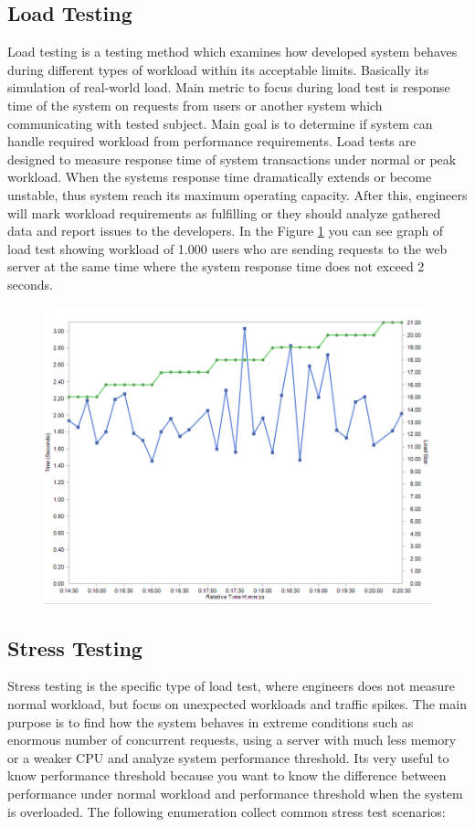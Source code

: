 \subsection*{Load Testing}
Load testing is a testing method which examines how developed system behaves during different types of workload within its acceptable limits. Basically its simulation of real-world load. Main metric to focus during load test is response time of the system on requests from users or another system which communicating with tested subject. Main goal is to determine if system can handle required workload from performance requirements. Load tests are designed to measure response time of system transactions under normal or peak workload. When the systems response time dramatically extends or become unstable, thus system reach its maximum operating capacity. After this, engineers will mark workload requirements as fulfilling or they should analyze gathered data and report issues to the developers. In the Figure \ref{fig:load_test} you can see graph of load test showing workload of 1.000 users who are sending requests to the web server at the same time where the system response time does not exceed 2 seconds.

\begin{figure}[H]
  \centering
  \includegraphics[width=15cm]{obrazky-figures/load-testing.png}
  \caption{}
  \label{fig:load_test}
\end{figure}

\subsection*{Stress Testing}
\label{Stress Testing}
Stress testing is the specific type of load test, where engineers does not measure normal workload, but focus on unexpected workloads and traffic spikes. The main purpose is to find how the system behaves in extreme conditions such as enormous number of concurrent requests, using a server with much less memory or a weaker CPU and analyze system performance threshold. Its very useful to know performance threshold because you want to know the difference between performance under normal workload and performance threshold when the system is overloaded. The following enumeration collect common stress test scenarios: 

